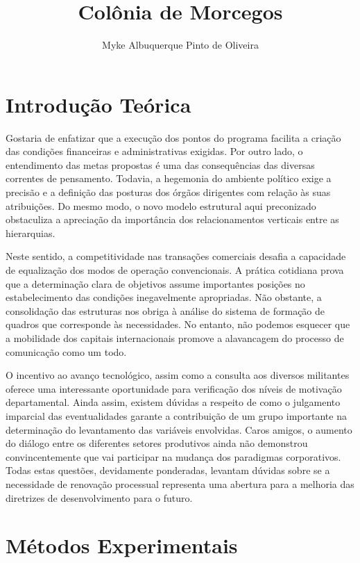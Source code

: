 \documentclass[10pt,a4paper,twoside]{article}
\author{Myke Albuquerque Pinto de Oliveira}
\title{{\Huge Colônia de Morcegos}}
\begin{document}
	\maketitle
	\newpage
	\tableofcontents
	\newpage
	
	\section{Introdução Teórica}
	
	\begin{multicols}{3}
		Gostaria de enfatizar que a execução dos pontos do programa facilita a criação das condições financeiras e administrativas exigidas. Por outro lado, o entendimento das metas propostas é uma das consequências das diversas correntes de pensamento. Todavia, a hegemonia do ambiente político exige a precisão e a definição das posturas dos órgãos dirigentes com relação às suas atribuições. Do mesmo modo, o novo modelo estrutural aqui preconizado obstaculiza a apreciação da importância dos relacionamentos verticais entre as hierarquias. 
	
		Neste sentido, a competitividade nas transações comerciais desafia a capacidade de equalização dos modos de operação convencionais. A prática cotidiana prova que a determinação clara de objetivos assume importantes posições no estabelecimento das condições inegavelmente apropriadas. Não obstante, a consolidação das estruturas nos obriga à análise do sistema de formação de quadros que corresponde às necessidades. No entanto, não podemos esquecer que a mobilidade dos capitais internacionais promove a alavancagem do processo de comunicação como um todo. 
		
		O incentivo ao avanço tecnológico, assim como a consulta aos diversos militantes oferece uma interessante oportunidade para verificação dos níveis de motivação departamental. Ainda assim, existem dúvidas a respeito de como o julgamento imparcial das eventualidades garante a contribuição de um grupo importante na determinação do levantamento das variáveis envolvidas. Caros amigos, o aumento do diálogo entre os diferentes setores produtivos ainda não demonstrou convincentemente que vai participar na mudança dos paradigmas corporativos. Todas estas questões, devidamente ponderadas, levantam dúvidas sobre se a necessidade de renovação processual representa uma abertura para a melhoria das diretrizes de desenvolvimento para o futuro.
	\end{multicols}
	
	\section{Métodos Experimentais} 
	
\end{document}
